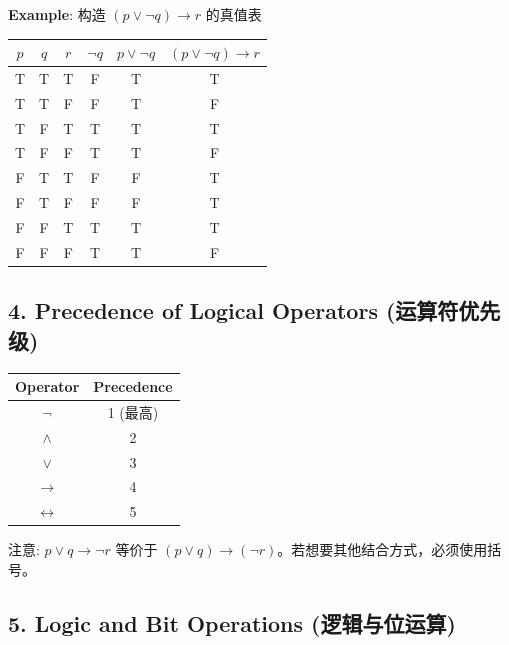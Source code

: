 \documentclass[10pt,a4paper,openany]{ctexbook}
\theoremstyle{definition}
\theoremstyle{remark}
\renewenvironment{quote}
  {\list{}{\leftmargin=1em\rightmargin=0pt\topsep=0.5pt\partopsep=0pt}\item[]}
  {\endlist}
\begin{document}
\textbf{Example}: 构造 $(p \lor \neg q) \to r$ 的真值表
\begin{center}
\begin{tabular}{cccccc}
\hline
$p$ & $q$ & $r$ & $\neg q$ & $p \lor \neg q$ & $(p \lor \neg q) \to r$ \\ \hline
T & T & T & F & T & T \\
T & T & F & F & T & F \\
T & F & T & T & T & T \\
T & F & F & T & T & F \\
F & T & T & F & F & T \\
F & T & F & F & F & T \\
F & F & T & T & T & T \\
F & F & F & T & T & F \\
\hline
\end{tabular}

\end{center}

\vspace{-2pt}

\subsection{4. Precedence of Logical Operators (运算符优先级)}

\begin{center}
\begin{tabular}{cc}
\hline
Operator & Precedence \\ \hline
$\neg$ & 1 (最高) \\
$\land$ & 2 \\
$\lor$ & 3 \\
$\to$ & 4 \\
$\leftrightarrow$ & 5 \\
\hline
\end{tabular}

\end{center}

\begin{quote}
注意: $p \lor q \to \neg r$ 等价于 $(p \lor q) \to (\neg r)$。若想要其他结合方式，必须使用括号。

\end{quote}
\vspace{-2pt}

\subsection{5. Logic and Bit Operations (逻辑与位运算)}
\end{document}
